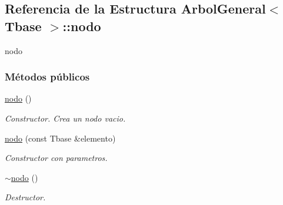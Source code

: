 \hypertarget{structArbolGeneral_1_1nodo}{\subsection{Referencia de la Estructura Arbol\-General$<$ Tbase $>$\-:\-:nodo}
\label{structArbolGeneral_1_1nodo}
}


nodo  


\subsubsection*{Métodos públicos}
\begin{DoxyCompactItemize}
\item 
\hyperlink{structArbolGeneral_1_1nodo_aa217b530d586a4f7908df98083c697ff}{nodo} ()
\begin{DoxyCompactList}\small\item\em Constructor. Crea un nodo vacio. \end{DoxyCompactList}\item 
\hyperlink{structArbolGeneral_1_1nodo_a858436a6f4cf67e88dcea51708871de9}{nodo} (const Tbase \&elemento)
\begin{DoxyCompactList}\small\item\em Constructor con parametros. \end{DoxyCompactList}\item 
\hyperlink{structArbolGeneral_1_1nodo_a70407725ad94243a38097cd7477a7f10}{$\sim$nodo} ()
\begin{DoxyCompactList}\small\item\em Destructor. \end{DoxyCompactList}\end{DoxyCompactItemize}
